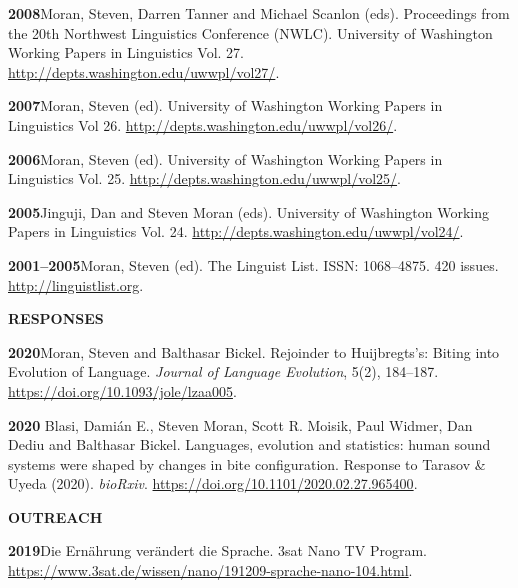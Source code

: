 \documentclass[11pt]{article}
\newcommand{\hangpara}{
 \setlength{\parindent}{0in} %
 \hangindent=0.42in %
}
\begin{document}
\vskip 6pt
\hangpara
{\bf 2008}\hspace{1ex}Moran, Steven, Darren Tanner and Michael Scanlon (eds). Proceedings from the 20th Northwest Linguistics Conference (NWLC). University of Washington Working Papers in Linguistics Vol. 27. \url{http://depts.washington.edu/uwwpl/vol27/}.

\vskip 6pt
\hangpara
{\bf 2007}\hspace{1ex}Moran, Steven (ed). University of Washington Working Papers in Linguistics Vol 26. \url{http://depts.washington.edu/uwwpl/vol26/}.

\vskip 6pt
\hangpara
{\bf 2006}\hspace{1ex}Moran, Steven (ed). University of Washington Working Papers in Linguistics Vol. 25. \url{http://depts.washington.edu/uwwpl/vol25/}.

\vskip 6pt
\hangpara
{\bf 2005}\hspace{1ex}Jinguji, Dan and Steven Moran (eds). University of Washington Working Papers in Linguistics Vol. 24. \url{http://depts.washington.edu/uwwpl/vol24/}.

\vskip 6pt
\hangpara
{\bf 2001--2005}\hspace{1ex}Moran, Steven (ed). The Linguist List. ISSN: 1068--4875. 420 issues. \url{http://linguistlist.org}.


\vskip 20pt
\begin{flushleft}
{\bf RESPONSES}
\end{flushleft}

\hangpara
{\bf 2020}\hspace{1ex}Moran, Steven and Balthasar Bickel. Rejoinder to Huijbregts’s: Biting into Evolution of Language. \textit{Journal of Language Evolution}, 5(2), 184--187. \url{https://doi.org/10.1093/jole/lzaa005}.

\vskip 6pt
\hangpara
{\bf 2020} Blasi, Damián E., Steven Moran, Scott R. Moisik, Paul Widmer, Dan Dediu and Balthasar Bickel. Languages, evolution and statistics: human sound systems were shaped by changes in bite configuration. Response to Tarasov \& Uyeda (2020). \textit{bioRxiv}. \url{https://doi.org/10.1101/2020.02.27.965400}.


\vskip 20pt
\begin{flushleft}
{\bf OUTREACH}
\end{flushleft}


\hangpara
{\bf 2019}\hspace{1ex}Die Ernährung verändert die Sprache. 3sat Nano TV Program. \url{https://www.3sat.de/wissen/nano/191209-sprache-nano-104.html}.
\end{document}
